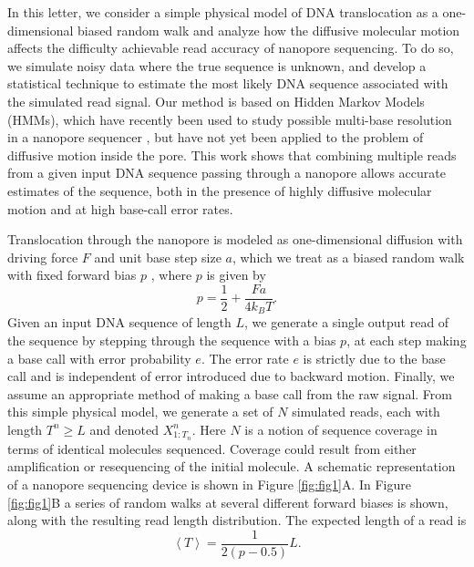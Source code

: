 \documentclass{biophys_letter}
\begin{document}
In this letter, we consider a simple physical model of DNA translocation as a one-dimensional biased random walk and analyze how the diffusive molecular motion affects the difficulty achievable read accuracy of nanopore sequencing.
To do so, we simulate noisy data where the true sequence is unknown, and develop a statistical technique to estimate the most likely DNA sequence associated with the simulated read signal.
Our method is based on Hidden Markov Models (HMMs), which have recently been used to study possible multi-base resolution in a nanopore sequencer \cite{Timp:2012}, but have not yet been applied to the problem of diffusive motion inside the pore.
This work shows that combining multiple reads from a given input DNA sequence passing through a nanopore allows accurate estimates of the sequence, both in the presence of highly diffusive molecular motion and at high base-call error rates.

Translocation through the nanopore is modeled as one-dimensional diffusion with driving force $F$ and unit base step size $a$, which we treat as a biased random walk with fixed forward bias $p$ \cite{Berg:1993}, where $p$ is given by
\begin{equation}
p = \frac{1}{2} + \frac{Fa}{4k_{B}T}.
\end{equation}
Given an input DNA sequence of length $L$, we generate a single output read of the sequence by stepping through the sequence with a bias $p$, at each step making a base call with error probability $e$.
The error rate $e$ is strictly due to the base call and is independent of error introduced due to backward motion. 
Finally, we assume an appropriate method of making a base call from the raw signal.
From this simple physical model, we generate a set of $N$ simulated reads, each with length $T^{n} \ge L$ and denoted $X^n_{1:T_n}$.
Here $N$ is a notion of sequence coverage in terms of identical molecules sequenced.
Coverage could result from either amplification or resequencing of the initial molecule.
A schematic representation of a nanopore sequencing device is shown in Figure \ref{fig:fig1}A.
In Figure \ref{fig:fig1}B a series of random walks at several different forward biases is shown, along with the resulting read length distribution.
The expected length of a read is 
\begin{equation}
  \left\langle T  \right\rangle = \frac{1}{2(p-0.5)} L.
\end{equation}
\end{document}
